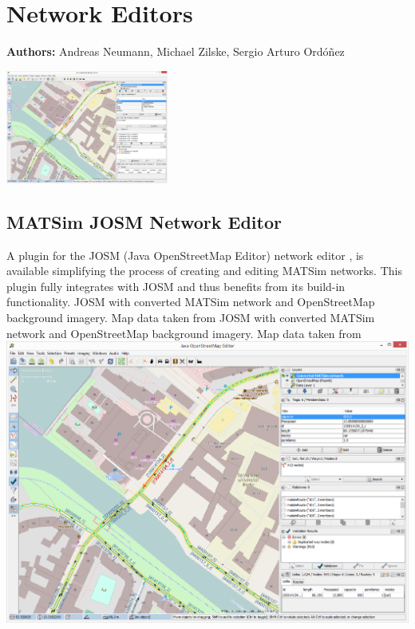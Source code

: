 \chapter{Network Editors}
\label{ch:networkeditor}

\hfill \textbf{Authors:} Andreas Neumann, Michael Zilske, Sergio Arturo Ordóñez

\begin{center} \includegraphics[width=0.4\textwidth, angle=0]{extending/figures/networkeditor/josm_screenshot} \end{center}


\section{MATSim JOSM Network Editor}
A plugin for the JOSM (Java OpenStreetMap Editor) network editor \citep[][]{JOSM2014}, is available simplifying the process of creating and editing MATSim networks. This plugin fully integrates with JOSM and thus benefits from its build-in functionality.
%
\createfigure
{JOSM with converted MATSim network and OpenStreetMap background imagery. Map data taken from \citet[][]{OpenStreetMap2014}}
{JOSM with converted MATSim network and OpenStreetMap background imagery. Map data taken from \citet[][]{OpenStreetMap2014}}
{\label{fig:networkeditor_screenshot}}
{\includegraphics[width=1.0\textwidth]{extending/figures/networkeditor/josm_screenshot}}
{}


